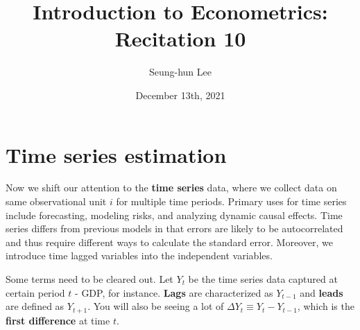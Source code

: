 \documentclass[12pt]{article}
\title{Introduction to Econometrics: Recitation 10}
\theoremstyle{definition}
\theoremstyle{property}
\theoremstyle{assumption}
\theoremstyle{example}
\theoremstyle{comment}
\begin{document}
\linespread{1.25}
\author{Seung-hun Lee}
\date{December 13th, 2021 }
\maketitle


\section{Time series estimation}
Now we shift our attention to the \textbf{time series} data, where we collect data on same observational unit $i$ for multiple time periods. Primary uses for time series include forecasting, modeling risks, and analyzing dynamic causal effects. Time series differs from previous models in that errors are likely to be autocorrelated and thus require different ways to calculate the standard error. Moreover, we introduce time lagged variables into the independent variables.
\par\medskip
Some terms need to be cleared out. Let $Y_t$ be the time series data captured at certain period $t$ - GDP, for instance. \textbf{Lags} are characterized as $Y_{t-1}$ and \textbf{leads} are defined as $Y_{t+1}$. You will also be seeing a lot of $\Delta Y_{t}\equiv Y_t-Y_{t-1}$, which is the \textbf{first difference} at time $t$. 
\par\medskip
\end{document}
